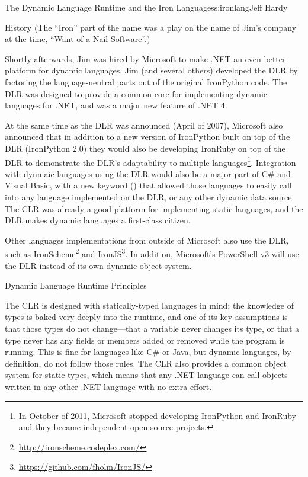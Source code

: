 \begin{aosachapter}{The Dynamic Language Runtime and the Iron Languages}{s:ironlang}{Jeff Hardy}
\begin{aosasect1}{History}
\noindent
(The ``Iron'' part of the name was a play on the name of Jim's company at the
time, ``Want of a Nail Software''.)

Shortly afterwards, Jim was hired by Microsoft to make .NET an even better
platform for dynamic languages. Jim (and several others) developed the DLR by
factoring the language-neutral parts out of the original IronPython code. The
DLR was designed to provide a common core for implementing dynamic languages
for .NET, and was a major new feature of .NET 4.

At the same time as the DLR was announced (April of 2007), Microsoft also
announced that in addition to a new version of IronPython built on top of the
DLR (IronPython 2.0) they would also be developing IronRuby on top of the DLR
to demonstrate the DLR's adaptability to multiple languages\footnote{In October
of 2011, Microsoft stopped developing IronPython and IronRuby and they became
independent open-source projects.}. Integration with dynmaic  languages using
the DLR would also be a major part of C\# and Visual Basic, with a new keyword
() that allowed those languages to easily call into any language
implemented on the DLR, or any other dynamic data source. The CLR was already a
good platform for implementing static languages, and the DLR makes dynamic
languages a first-class citizen.

Other languages implementations from outside of Microsoft also use the DLR,
such as IronScheme\footnote{\url{http://ironscheme.codeplex.com/}} and
IronJS\footnote{\url{https://github.com/fholm/IronJS/}}. In addition,
Microsoft's PowerShell v3 will use the DLR instead of its own dynamic object
system.

\end{aosasect1}

\begin{aosasect1}{Dynamic Language Runtime Principles}

The CLR is designed with statically-typed languages in mind; the knowledge of
types is baked very deeply into the runtime, and one of its key assumptions is
that those types do not change---that a variable never changes its type, or
that a type never has any fields or members added or removed while the program
is running. This is fine for languages like C\# or Java, but dynamic languages,
by definition, do not follow those rules. The CLR also provides a common object
system for static types, which means that any .NET language can call objects
written in any other .NET language with no extra effort.


\end{aosasect1}
\end{aosachapter}

